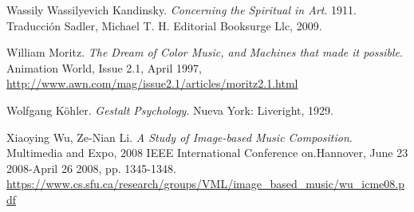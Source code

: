 \begin{thebibliography}{9}
 Wassily Wassilyevich Kandinsky. \emph{Concerning the Spiritual in Art}. 1911. Traducción Sadler, Michael T. H. Editorial Booksurge Llc, 2009.

 William Moritz. \emph{The Dream of Color Music, and Machines that made it possible}. Animation World, Issue 2.1, April 1997,\\ 
 \url{http://www.awn.com/mag/issue2.1/articles/moritz2.1.html}

 Wolfgang Köhler. \emph{Gestalt Psychology}. Nueva York: Liveright, 1929.

 Xiaoying Wu, Ze-Nian Li. \emph{A Study of Image-based Music Composition}. Multimedia and Expo, 2008 IEEE International Conference on.Hannover, June 23 2008-April 26 2008, pp. 1345-1348.\\
 \url{https://www.cs.sfu.ca/research/groups/VML/image_based_music/wu_icme08.pdf}
\end{thebibliography}